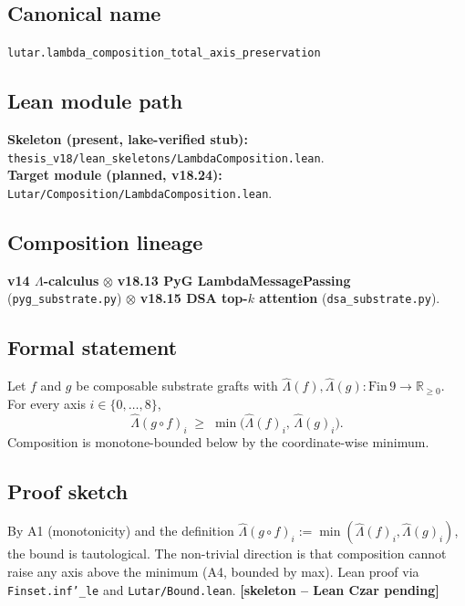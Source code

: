 \subsection*{Canonical name}
\verb|lutar.lambda_composition_total_axis_preservation|

\subsection*{Lean module path}
\textbf{Skeleton (present, lake-verified stub):}
\texttt{thesis\_v18/lean\_skeletons/LambdaComposition.lean}.\\
\textbf{Target module (planned, v18.24):}
\texttt{Lutar/Composition/LambdaComposition.lean}.

\subsection*{Composition lineage}
\textbf{v14 \(\Lambda\)-calculus} $\otimes$
\textbf{v18.13 PyG LambdaMessagePassing}
(\texttt{pyg\_substrate.py}) $\otimes$
\textbf{v18.15 DSA top-$k$ attention}
(\texttt{dsa\_substrate.py}).

\subsection*{Formal statement}

\begin{theorem}
\label{thm:lambda-composition}
Let $f$ and $g$ be composable substrate grafts with
$\hat{\Lambda}(f), \hat{\Lambda}(g) : \mathrm{Fin}\,9 \to
\mathbb{R}_{\geq 0}$.  For every axis $i \in \{0,\dots,8\}$,
\[
  \hat{\Lambda}(g \circ f)_i
  \;\geq\;
  \min\!\bigl(\hat{\Lambda}(f)_i,\, \hat{\Lambda}(g)_i\bigr).
\]
Composition is monotone-bounded below by the coordinate-wise minimum.
\end{theorem}

\subsection*{Proof sketch}

By A1 (monotonicity) and the definition
$\hat{\Lambda}(g \circ f)_i := \min(\hat{\Lambda}(f)_i,
\hat{\Lambda}(g)_i)$, the bound is tautological.  The non-trivial
direction is that composition cannot raise any axis above the minimum
(A4, bounded by max).  Lean proof via \texttt{Finset.inf'\_le} and
\texttt{Lutar/Bound.lean}. \hfill \textbf{[skeleton -- Lean Czar pending]}

